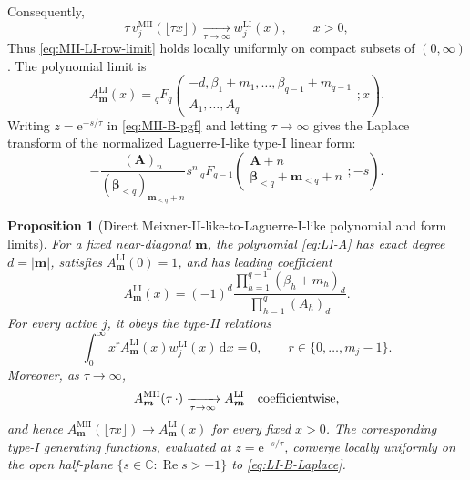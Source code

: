 \documentclass[10pt]{amsart}
\newcommand{\e}{\mathrm e}
\newcommand{\dd}{\,\mathrm d}
\newcommand{\A}{\boldsymbol A}
\newcommand{\bbeta}{\boldsymbol\beta}
\newcommand{\mm}{\boldsymbol m}
\newcommand{\abs}[1]{\lvert#1\rvert}
\newcommand{\pFq}[5]{{}_{#1}F_{#2}\!\left(\begin{matrix}#3\\#4\end{matrix};#5\right)}
\theoremstyle{plain}
\newtheorem{proposition}[theorem]{Proposition}
\theoremstyle{definition}
\theoremstyle{remark}
\begin{document}
Consequently,
\begin{equation}
 \tau\,v_j^{\mathrm{MII}}(\lfloor\tau x\rfloor)
 \xrightarrow[\tau\to\infty]{} w_j^{\mathrm{LI}}(x),\qquad x>0,
 \label{eq:MII-LI-row-limit}
\end{equation}
Thus \eqref{eq:MII-LI-row-limit} holds locally uniformly on compact
subsets of \((0,\infty)\). The polynomial
limit is
\begin{equation}
 A_{\mm}^{\mathrm{LI}}(x)
 =\pFq{q}{q}
 {-d,\beta_1+m_1,\ldots,\beta_{q-1}+m_{q-1}}
 {A_1,\ldots,A_q}{x}.
 \label{eq:LI-A}
\end{equation}
Writing \(z=\e^{-s/\tau}\) in \eqref{eq:MII-B-pgf} and letting
\(\tau\to\infty\) gives the Laplace
transform of the normalized Laguerre-I-like type-I linear form:
\begin{equation}
 -\frac{(\A)_n}{(\bbeta_{<q})_{\mm_{<q}+n}}
 s^n\,
 \pFq{q}{q-1}
 {\A+n}{\bbeta_{<q}+\mm_{<q}+n}{-s}.
 \label{eq:LI-B-Laplace}
\end{equation}

\begin{proposition}[Direct Meixner-II-like-to-Laguerre-I-like polynomial and form limits]
\label{prop:MII-LI-polynomial-form-limit}
For a fixed near-diagonal \(\mm\), the polynomial
\eqref{eq:LI-A} has exact degree \(d=\abs\mm\), satisfies
\(A_{\mm}^{\mathrm{LI}}(0)=1\), and has leading coefficient
\begin{equation}
 [x^d]A_{\mm}^{\mathrm{LI}}(x)
 =(-1)^d
 \frac{\displaystyle\prod_{h=1}^{q-1}(\beta_h+m_h)_d}
      {\displaystyle\prod_{h=1}^{q}(A_h)_d}.
 \label{eq:LI-A-leading-coefficient}
\end{equation}
For every active \(j\), it obeys the type-II relations
\begin{equation}
 \int_0^\infty x^rA_{\mm}^{\mathrm{LI}}(x)
 w_j^{\mathrm{LI}}(x)\dd x=0,
 \qquad r\in\{0,\ldots,m_j-1\}.
 \label{eq:LI-A-orthogonality}
\end{equation}
Moreover, as \(\tau\to\infty\),
\begin{equation}
 A_{\mm}^{\mathrm{MII}}(\tau\,\cdot)
 \xrightarrow[\tau\to\infty]{}A_{\mm}^{\mathrm{LI}}
 \quad\hbox{coefficientwise},
 \label{eq:MII-LI-A-limit}
\end{equation}
and hence
\(A_{\mm}^{\mathrm{MII}}(\lfloor\tau x\rfloor)
\to A_{\mm}^{\mathrm{LI}}(x)\) for every fixed \(x>0\).
The corresponding type-I generating functions, evaluated at
\(z=\e^{-s/\tau}\), converge locally uniformly on the open half-plane
\(\{s\in\mathbb C:\operatorname{Re}s>-1\}\) to
\eqref{eq:LI-B-Laplace}.
\end{proposition}
\end{document}
